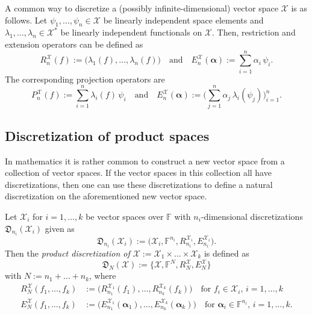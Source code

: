 \documentclass[a4paper]{paper}
\newcommand{\Discr}{\mathfrak{D}}
\newcommand{\Spc}[1]{\mathscr{#1}}
\newcommand{\Field}{\mathbb{F}}
\newcommand*{\EXT}[2]{\ensuremath{E_{#1}^{#2}}}
\newcommand*{\REST}[2]{\ensuremath{R_{#1}^{#2}}}
\newcommand*{\PROJ}[2]{\ensuremath{P_{#1}^{#2}}}
\newcommand*{\RnX}{\ensuremath{\REST{n}{\Spc{X}}}}
\newcommand*{\EnX}{\ensuremath{\EXT{n}{\Spc{X}}}}
\newcommand*{\PnX}{\ensuremath{\PROJ{n}{\Spc{X}}}}
\newcommand{\valpha}{\boldsymbol{\alpha}}
\begin{document}
\begin{examp}
 A common way to discretize a (possibly infinite-dimensional) vector space $\Spc{X}$ is as follows. Let 
 $\psi_1, \ldots, \psi_n \in \Spc{X}$ be linearly independent space elements and 
 $\lambda_1, \ldots, \lambda_n \in \Spc{X}^*$ be linearly independent functionals on $\Spc{X}$. Then, restriction and 
 extension operators can be defined as
 \begin{equation*}
  \RnX(f) := \big( \lambda_1(f), \ldots, \lambda_n(f) \big) 
  \quad \text{and} \quad
  \EnX(\valpha) := \sum_{i=1}^n \alpha_i\, \psi_i.
 \end{equation*}
 The corresponding projection operators are
 \begin{equation*}
  \PnX(f) := \sum_{i=1}^n \lambda_i(f)\, \psi_i
  \quad \text{and} \quad
  \EnX(\valpha) := \bigg( \sum_{j=1}^n \alpha_j\, \lambda_i(\psi_j) \bigg)_{i=1}^n.
 \end{equation*}

\end{examp}


\subsection{Discretization of product spaces}
\label{subsec:product_space_discretization}

In mathematics it is rather common to construct a new vector space from a collection of vector spaces. If the vector 
spaces in this 
collection all have discretizations, then one can use these discretizations to define a natural discretization on the 
aforementioned new 
vector space.

\begin{definition}
 \label{def:product_space_discretization}
 Let $\Spc{X}_i$ for $i=1,\ldots,k$ be vector spaces over $\Field$ with $n_i$-dimensional discretizations 
 $\Discr_{n_i}(\Spc{X}_i)$ given as
 \begin{equation*}
  \Discr_{n_i}(\Spc{X}_i) := \bigl( \Spc{X}_i, \Field^{n_i}, \REST{n_i}{\Spc{X}_i}, \EXT{n_i}{\Spc{X}_i} \bigr). 
 \end{equation*}
 Then the \emph{product discretization of $\Spc{X} := \Spc{X}_1 \times \ldots \times \Spc{X}_k$} is defined as 
 \begin{equation*}
  \Discr_{N}(\Spc{X}):=\{\Spc{X}, \Field^N, R_{N}^{\Spc{X}}, E_{N}^{\Spc{X}} \}
 \end{equation*}
 with $N := n_1 + \ldots + n_k$, where
 \begin{align*}
  \REST{N}{\Spc{X}}(f_1,\ldots,f_k) &:= \bigl( \REST{n_1}{\Spc{X}_1}(f_1),\ldots,\REST{n_k}{\Spc{X}_k}(f_k) \bigr)
   \quad\text{for $f_i\in \Spc{X}_i$, $i=1,\ldots,k$} \\
  \EXT{N}{\Spc{X}}(f_1,\ldots,f_k) &:= \bigl( \EXT{n_1}{\Spc{X}_1}(\valpha_1),\ldots,\EXT{n_k}{\Spc{X}_k}(\valpha_k) 
\bigr)
   \quad\text{for $\valpha_i\in \Field^{n_i}$, $i=1,\ldots,k$.}
 \end{align*}
\end{definition}
\end{document}
